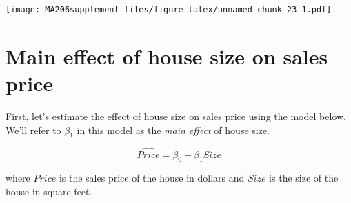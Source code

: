 \documentclass[]{book}
\newenvironment{Shaded}{\begin{snugshade}}{\end{snugshade}}
\newcommand{\DataTypeTok}[1]{\textcolor[rgb]{0.13,0.29,0.53}{#1}}
\newcommand{\KeywordTok}[1]{\textcolor[rgb]{0.13,0.29,0.53}{\textbf{#1}}}
\newcommand{\NormalTok}[1]{#1}
\newcommand{\OperatorTok}[1]{\textcolor[rgb]{0.81,0.36,0.00}{\textbf{#1}}}
\newcommand{\StringTok}[1]{\textcolor[rgb]{0.31,0.60,0.02}{#1}}
\begin{document}
\begin{Shaded}
\end{Shaded}

\texttt{[image: MA206supplement\_files/figure-latex/unnamed-chunk-23-1.pdf]}

\hypertarget{main-effect-of-house-size-on-sales-price}{%
\section{Main effect of house size on sales price}\label{main-effect-of-house-size-on-sales-price}}

First, let's estimate the effect of house size on sales price using the model below. We'll refer to \(\beta_1\) in this model as the \emph{main effect} of house size.

\[\widehat{Price} = \beta_0 + \beta_1 Size\]

where \(Price\) is the sales price of the house in dollars and \(Size\) is the size of the house in square feet.

\begin{Shaded}
\end{Shaded}
\end{document}
